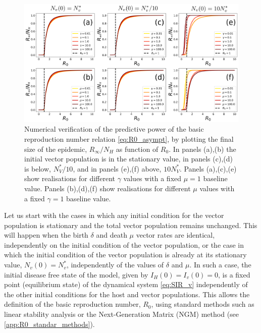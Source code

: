 \begin{figure}[t!]
    \centering
    \includegraphics[width=\textwidth]{Figures/R0_check_stationary.pdf}
    \caption{Numerical verification of the predictive  power of the basic
        reproduction number relation \cref{eq:R0_asympt}, by plotting the final
        size of
        the epidemic, $R_\infty/N_H$ as function of $R_0$. In panels (a),(b)
        the
        initial vector population is in the stationary value, in panels (c),(d)
        is
        below, $N_V^*/10$, and in panels (e),(f) above, $10 N_V^*$. Panels
        (a),(c),(e)
        show realisations for different $\gamma$ values with a fixed $\mu=1$
        baseline
        value. Panels (b),(d),(f) show realisations for different $\mu$ values
        with a
        fixed $\gamma=1$ baseline value.}
    \label{fig:R0_check_stationary}
\end{figure}

Let us start with the cases in which any initial condition for the vector
population is stationary  and the total vector population remains unchanged.
This will happen when the birth $\delta$ and death $\mu$ vector rates are
identical, independently on the initial condition of the vector population, or
the case in which the initial condition of the vector population is already at
its stationary value, $N_v(0)=N_v^*$, independently of the values of $\delta$
and $\mu$. In such a case, the initial disease free state of the model, given
by $I_H(0)=I_v(0)=0$, is a fixed point (equilibrium state) of the dynamical
system \cref{eq:SIR_v} independently of the other initial conditions for the
host and vector populations. This allows the definition of the basic
reproduction number, $R_0$, using standard methods such as linear stability
analysis or the Next-Generation Matrix (NGM) method \cite{Diekmann2010} (see
\ref{app:R0_standar_methods}).

